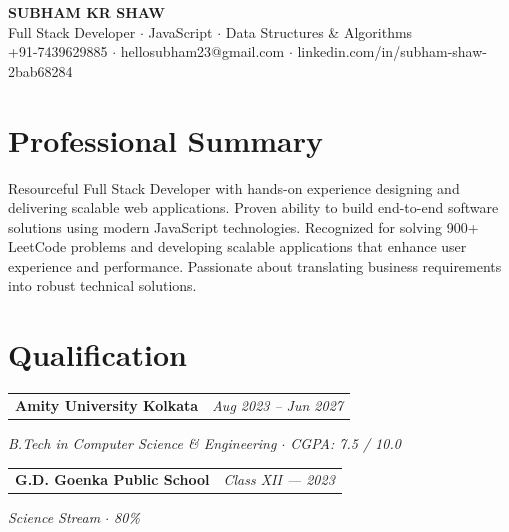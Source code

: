 \documentclass[10.5pt,a4paper]{article}
\makeatletter
\newcommand{\entry}[2]{%
  \vspace{3pt}
  \noindent
  \begin{tabularx}{\linewidth}{@{}X r@{}}
    \textbf{\color{darktext} #1} & \textit{\color{graytext}\small #2} \\
  \end{tabularx}
}
\newcommand{\subentry}[1]{%
  {\itshape\color{graytext}\small #1}\par\vspace{2pt}
}
\makeatother
\begin{document}
\begin{center}
    {\fontsize{22}{24}\selectfont\bfseries\color{navy} SUBHAM KR SHAW}\\[4pt]
    {\small\color{graytext} Full Stack Developer  $\cdot$ JavaScript $\cdot$ Data Structures \& Algorithms}\\[6pt]
    {\small
      +91\hspace{0pt}-\hspace{0pt}7439629885 \quad $\cdot$ \quad
       hellosubham23\hspace{0pt}@\hspace{0pt}gmail\hspace{0pt}.\hspace{0pt}com \quad $\cdot$ \quad
      linkedin\hspace{0pt}.\hspace{0pt}com\hspace{0pt}/\hspace{0pt}in\hspace{0pt}/\hspace{0pt}subham-shaw-2bab68284
    }
\end{center}
\vspace{-2pt}

\section*{Professional Summary}
\justifying
Resourceful Full Stack Developer with hands-on experience designing and delivering scalable web applications. Proven ability to build end-to-end software solutions using modern JavaScript technologies. Recognized for solving 900+ LeetCode problems and developing scalable applications that enhance user experience and performance. Passionate about translating business requirements into robust technical solutions.

\section*{Qualification}

\entry{Amity University Kolkata}{Aug 2023 -- Jun 2027}
\subentry{B.Tech in Computer Science \& Engineering $\cdot$ CGPA: 7.5 / 10.0}

\entry{G.D. Goenka Public School}{Class XII --- 2023}
\subentry{Science Stream $\cdot$ 80\%}
\end{document}
